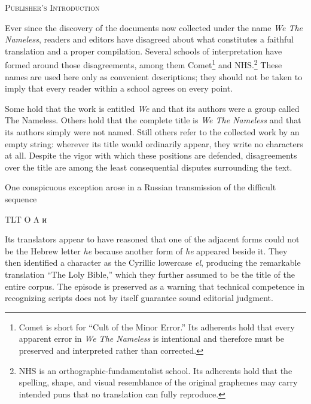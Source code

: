 \label{gen-apoc:introduction}

\begin{center}
	{\EnglishFont\large\scshape Publisher's Introduction}
\end{center}

\begingroup
\small
\sloppy

Ever since the discovery of the documents now collected under the name
\textit{We The Nameless}, readers and editors have disagreed about what
constitutes a faithful translation and a proper compilation.  Several schools
of interpretation have formed around those disagreements, among them
Comet\footnote{Comet is short for ``Cult of the Minor Error.''  Its adherents
hold that every apparent error in \textit{We The Nameless} is intentional and
therefore must be preserved and interpreted rather than corrected.} and
NHS.\footnote{NHS is an orthographic-fundamentalist school.  Its adherents hold
that the spelling, shape, and visual resemblance of the original graphemes may
carry intended puns that no translation can fully reproduce.}  These names are
used here only as convenient descriptions; they should not be taken to imply
that every reader within a school agrees on every point.

Some hold that the work is entitled \textit{We} and that its authors were a
group called The Nameless.  Others hold that the complete title is
\textit{We The Nameless} and that its authors simply were not named.  Still
others refer to the collected work by an empty string: wherever its title
would ordinarily appear, they write no characters at all.  Despite the vigor
with which these positions are defended, disagreements over the title are
among the least consequential disputes surrounding the text.

One conspicuous exception arose in a Russian transmission of the difficult
sequence

\begin{center}
	\textdir TLT
	\mbox{} \mbox{} O Λ  
	\mbox{} {\CyrillicFont и} 
	\mbox{} \mbox{}
\end{center}

Its translators appear to have reasoned that one of the adjacent forms could
not be the Hebrew letter \textit{he} because another form of \textit{he}
appeared beside it.  They then identified a character as the Cyrillic
lowercase \textit{el}, producing the remarkable translation
``The Loly Bible,'' which they further assumed to be the title of the entire
corpus.  The episode is preserved as a warning that technical competence in
recognizing scripts does not by itself guarantee sound editorial judgment.

